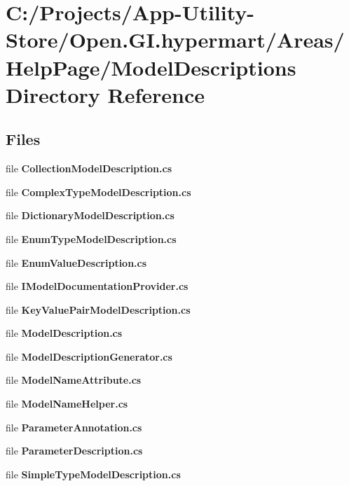\section{C\+:/\+Projects/\+App-\/\+Utility-\/\+Store/\+Open.G\+I.\+hypermart/\+Areas/\+Help\+Page/\+Model\+Descriptions Directory Reference}
\label{dir_a3a9debc45675a3c23daec858c180c37}
\subsection*{Files}
\begin{DoxyCompactItemize}
\item 
file \textbf{ Collection\+Model\+Description.\+cs}
\item 
file \textbf{ Complex\+Type\+Model\+Description.\+cs}
\item 
file \textbf{ Dictionary\+Model\+Description.\+cs}
\item 
file \textbf{ Enum\+Type\+Model\+Description.\+cs}
\item 
file \textbf{ Enum\+Value\+Description.\+cs}
\item 
file \textbf{ I\+Model\+Documentation\+Provider.\+cs}
\item 
file \textbf{ Key\+Value\+Pair\+Model\+Description.\+cs}
\item 
file \textbf{ Model\+Description.\+cs}
\item 
file \textbf{ Model\+Description\+Generator.\+cs}
\item 
file \textbf{ Model\+Name\+Attribute.\+cs}
\item 
file \textbf{ Model\+Name\+Helper.\+cs}
\item 
file \textbf{ Parameter\+Annotation.\+cs}
\item 
file \textbf{ Parameter\+Description.\+cs}
\item 
file \textbf{ Simple\+Type\+Model\+Description.\+cs}
\end{DoxyCompactItemize}
